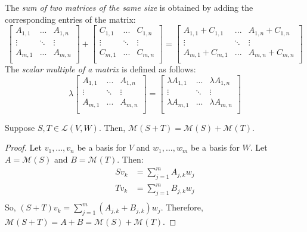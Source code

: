 \documentclass{article}
\begin{document}
\begin{definition}
  \label{def:addition-scalar-multiplication-of-matrix}
  The\textit{ sum of two matrices of the same size} is obtained by adding the
  corresponding entries of the matrix:
  \[
    \begin{bmatrix}
      A_{1,1} & ... & A_{1,n} \\
      \vdots & \ddots & \vdots \\
      A_{m,1} & ... & A_{m,n} \\
    \end{bmatrix}
    +
    \begin{bmatrix}
      C_{1,1} & ... & C_{1,n} \\
      \vdots & \ddots & \vdots \\
      C_{m,1} & ... & C_{m,n} \\
    \end{bmatrix}
    =
    \begin{bmatrix}
      A_{1,1} + C_{1, 1} & ... & A_{1, n} + C_{1,n} \\
      \vdots & \ddots & \vdots \\
      A_{m, 1} + C_{m,1} & ... & A_{m, n} + C_{m,n} \\
    \end{bmatrix}
  \]
  The \textit{scalar multiple of a matrix} is defined as follows:
  \[
    \lambda
    \begin{bmatrix}
      A_{1,1} & ... & A_{1,n} \\
      \vdots & \ddots & \vdots \\
      A_{m,1} & ... & A_{m,n} \\
    \end{bmatrix}
    =
    \begin{bmatrix}
      \lambda A_{1,1} & ... & \lambda A_{1,n} \\
      \vdots & \ddots & \vdots \\
      \lambda A_{m,1} & ... & \lambda A_{m,n} \\
    \end{bmatrix}
  \]
\end{definition}

\begin{theorem}
  \label{thm:matrix-of-the-sum-of-linear-maps}
  Suppose $S, T \in \mathcal{L}(V, W)$. Then, $\mathcal{M}(S + T) =
  \mathcal{M}(S) + \mathcal{M}(T)$.
\end{theorem}
\begin{proof}
  Let $v_1, ..., v_n$ be a basis for $V$ and $w_1, ..., w_m$ be a
  basis for $W$. Let $A = \mathcal{M}(S)$ and $B = \mathcal{M}(T)$. Then:
  \begin{align*}
    Sv_k &= \sum_{j=1}^m A_{j,k}w_j \\
    Tv_k &= \sum_{j=1}^m B_{j,k}w_j \\
  \end{align*}
  So, $(S + T)v_k = \sum_{j=1}^m (A_{j, k} + B_{j, k})w_j$. Therefore,
  $\mathcal{M}(S + T) = A + B = \mathcal{M}(S) + \mathcal{M}(T)$. 
\end{proof}
\end{document}

